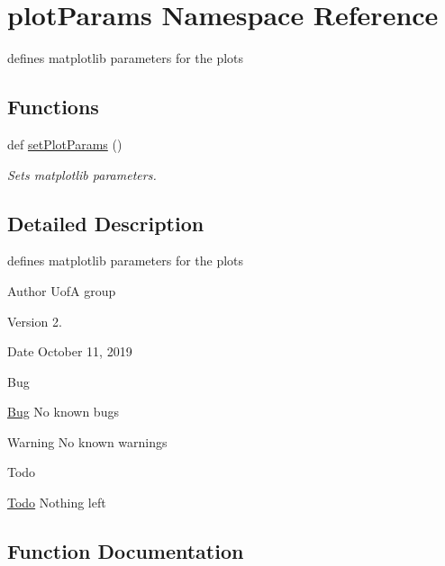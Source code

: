 \hypertarget{namespaceplot_params}{}\section{plot\+Params Namespace Reference}
\label{namespaceplot_params}


defines matplotlib parameters for the plots  


\subsection*{Functions}
\begin{DoxyCompactItemize}
\item 
def \mbox{\hyperlink{namespaceplot_params_aabb3da71763d781d4579212e8d1278c5}{set\+Plot\+Params}} ()
\begin{DoxyCompactList}\small\item\em Sets matplotlib parameters. \end{DoxyCompactList}\end{DoxyCompactItemize}


\subsection{Detailed Description}
defines matplotlib parameters for the plots 

\begin{DoxyAuthor}{Author}
UofA group
\end{DoxyAuthor}
\begin{DoxyVersion}{Version}
2.
\end{DoxyVersion}
\begin{DoxyDate}{Date}
October 11, 2019
\end{DoxyDate}
\begin{DoxyRefDesc}{Bug}
\item[\mbox{\hyperlink{bug__bug000008}{Bug}}]No known bugs\end{DoxyRefDesc}


\begin{DoxyWarning}{Warning}
No known warnings
\end{DoxyWarning}
\begin{DoxyRefDesc}{Todo}
\item[\mbox{\hyperlink{todo__todo000008}{Todo}}]Nothing left \end{DoxyRefDesc}


\subsection{Function Documentation}
\mbox{\label{namespaceplot_params_aabb3da71763d781d4579212e8d1278c5}} 
